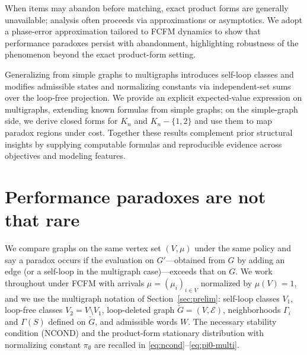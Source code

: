 \documentclass[11pt]{article}
\begin{document}
{When items may abandon before matching, exact product forms are generally unavailable; analysis often proceeds via approximations or asymptotics. We adopt a phase-error approximation tailored to \textsc{FCFM} dynamics to show that performance paradoxes persist with abandonment, highlighting robustness of the phenomenon beyond the exact product-form setting.

Generalizing from simple graphs to multigraphs introduces self-loop classes and modifies admissible states and normalizing constants via independent-set sums over the loop-free projection. We provide an explicit expected-value expression on multigraphs, extending known formulas from simple graphs; on the simple-graph side, we derive closed forms for $K_n$ and $K_n-\{1,2\}$ and use them to map paradox regions under cost. Together these results complement prior structural insights by supplying computable formulas and reproducible evidence across objectives and modeling features.

\section{Performance paradoxes are not that rare}\label{sec:partI}
We compare graphs on the same vertex set $(V,\mu)$ under the same policy and say a paradox occurs if the evaluation on $G'$—obtained from $G$ by adding an edge (or a self-loop in the multigraph case)—exceeds that on $G$.
We work throughout under \textsc{FCFM} with arrivals $\mu=(\mu_i)_{i\in V}$ normalized by $\mu(V)=1$, and we use the multigraph notation of Section~\ref{sec:prelim}: self-loop classes $V_1$, loop-free classes $V_2=V\setminus V_1$, loop-deleted graph $\check{G}=(V,\mathcal{E})$, neighborhoods $\Gamma_i$ and $\Gamma(S)$ defined on $\check{G}$, and admissible words $W$. The necessary stability condition (\textsc{NCOND}) and the product-form stationary distribution with normalizing constant $\pi_{\emptyset}$ are recalled in \eqref{eq:ncond}–\eqref{eq:pi0-multi}.

}
\end{document}
